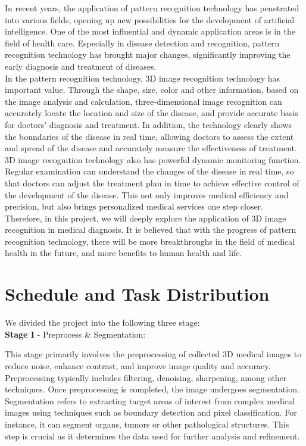 \documentclass[12pt,a4paper]{report}
\begin{document}
\qquad In recent years, the application of pattern recognition technology has penetrated into various fields, opening up new possibilities for the development of artificial intelligence.
One of the most influential and dynamic application areas is in the field of health care. Especially in disease detection and recognition, pattern recognition technology has brought major
changes, significantly improving the early diagnosis and treatment of diseases.\\

\qquad In the pattern recognition technology, 3D image recognition technology has important value. Through the shape, size, color and other information, based on the image analysis
and calculation, three-dimensional image recognition can accurately locate the location and size of the disease, and provide accurate basis for doctors' diagnosis and treatment.
In addition, the technology clearly shows the boundaries of the disease in real time, allowing doctors to assess the extent and spread of the disease and accurately measure the
effectiveness of treatment.\\

\qquad 3D image recognition technology also has powerful dynamic monitoring function. Regular examination can understand the changes of the disease in real time, so that doctors can adjust
the treatment plan in time to achieve effective control of the development of the disease. This not only improves medical efficiency and precision, but also brings personalized medical
services one step closer.\\

\qquad Therefore, in this project, we will deeply explore the application of 3D image recognition in medical diagnosis. It is believed that with the progress of pattern recognition technology,
there will be more breakthroughs in the field of medical health in the future, and more benefits to human health and life.

\section{Schedule and Task Distribution}

We divided the project into the following three stage: \\

\textbf{Stage I} - Preprocess \& Segmentation:

\qquad This stage primarily involves the preprocessing of collected 3D medical images to reduce noise, enhance contrast, and improve image quality and accuracy. Preprocessing typically includes
filtering, denoising, sharpening, among other techniques. Once preprocessing is completed, the image undergoes segmentation. Segmentation refers to extracting target areas of interest from complex
medical images using techniques such as boundary detection and pixel classification. For instance, it can segment organs, tumors or other pathological structures. This step is crucial as it
determines the data used for further analysis and refinement.\\
\end{document}
